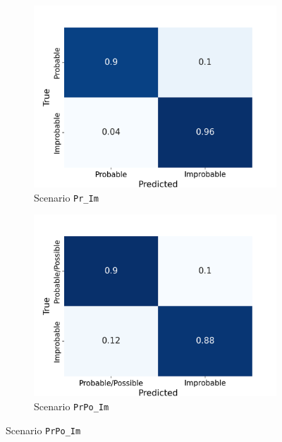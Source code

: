 \documentclass[Journal, letterpaper, DoubleSpace, InsideFigs]{ascelike-new}
\begin{document}
\begin{figure}[ht]
  \centering
  \begin{subfigure}[t]{.45\linewidth}
    \centering
    \includegraphics[width=\linewidth, trim={0 0 1cm 1cm}, clip]{opt-confusion-matrix-Pr_Im-128-px.png}
    \caption{Scenario \texttt{Pr\_Im}}
    \label{pr_im_cm}
  \end{subfigure}%
   \begin{subfigure}[t]{.45\linewidth}
    \centering
    \includegraphics[width=\linewidth, trim={0 0 1cm 1cm}, clip]{opt-confusion-matrix-PrPo_Im-128-px.png}
    \caption{Scenario \texttt{PrPo\_Im}}
    \label{prpo_im_cm}
  \end{subfigure}%
  

\end{figure}
\end{document}
